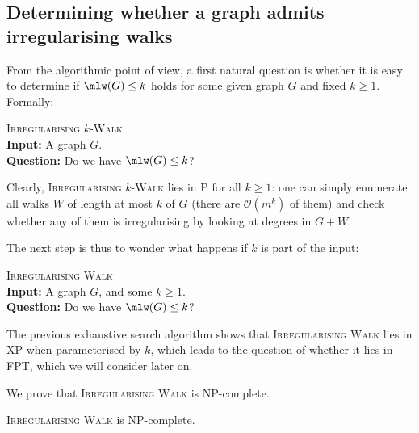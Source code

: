 \documentclass[a4paper,11pt,dvipsnames]{elsarticle}
\begin{document}
\subsection{Determining whether a graph admits irregularising walks}

From the algorithmic point of view, 
a first natural question is whether it is easy to determine if $\mlw(G) \leq k$ holds for some given graph $G$ and fixed $k \geq 1$.
Formally:

\medskip

\noindent\textsc{Irregularising $k$-Walk}\\
\noindent\textbf{Input:} A graph $G$.\\
\noindent\textbf{Question:} Do we have $\mlw(G) \leq k$?

\medskip

Clearly, \textsc{Irregularising $k$-Walk} lies in \textsf{P} for all $k \geq 1$: one can simply enumerate all walks $W$ of length at most $k$
of $G$ (there are $\mathcal{O}(m^k)$ of them) and check whether any of them is irregularising by looking at degrees in $G+W$. 

The next step is thus to wonder what happens if $k$ is part of the input:

\medskip

\noindent\textsc{Irregularising Walk}\\
\noindent\textbf{Input:} A graph $G$, and some $k \geq 1$.\\
\noindent\textbf{Question:} Do we have $\mlw(G) \leq k$?

\medskip

The previous exhaustive search algorithm shows that \textsc{Irregularising Walk} lies in \textsf{XP} when parameterised by $k$, which leads to the question of whether it lies in \textsf{FPT}, which we will consider later on.

We prove that \textsc{Irregularising Walk} is \textsf{NP}-complete.

\begin{theorem}\label{theorem:npc-walks}
\textsc{Irregularising Walk} is \textsf{NP}-complete.
\end{theorem}
\end{document}
